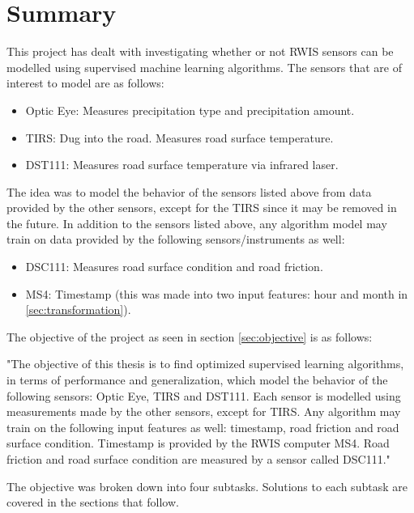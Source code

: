 \chapter{Summary}

	This project has dealt with investigating whether or not RWIS sensors can be modelled using supervised machine learning algorithms. The sensors that are of interest to model are as follows:
	\begin{itemize}
		\item{Optic Eye:} Measures precipitation type and precipitation amount.
		\item{TIRS:} Dug into the road. Measures road surface temperature.
		\item{DST111:} Measures road surface temperature via infrared laser.
	\end{itemize}
	
	The idea was to model the behavior of the sensors listed above from data provided by the other sensors, except for the TIRS since it may be removed in the future. In addition to the sensors listed above, any algorithm model may train on data provided by the following sensors/instruments as well:
	\begin{itemize}
		\item{DSC111:} Measures road surface condition and road friction.
		\item{MS4:} Timestamp (this was made into two input features: hour and month in \ref{sec:transformation}).
	\end{itemize}

	The objective of the project as seen in section \ref{sec:objective} is as follows:

	"The objective of this thesis is to find optimized supervised learning algorithms, in terms of performance and generalization, which model the behavior of the following sensors: Optic Eye, TIRS and DST111. Each sensor is modelled using measurements made by the other sensors, except for TIRS. Any algorithm may train on the following input features as well: timestamp, road friction and road surface condition. Timestamp is provided by the RWIS computer MS4. Road friction and road surface condition are measured by a sensor called DSC111."

	The objective was broken down into four subtasks. Solutions to each subtask are covered in the sections that follow.

